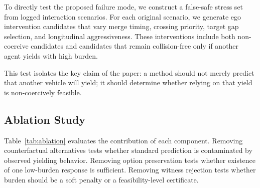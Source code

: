 \documentclass[10pt]{article}
\begin{document}
To directly test the proposed failure mode, we construct a false-safe stress set from logged interaction scenarios. For each original scenario, we generate ego intervention candidates that vary merge timing, crossing priority, target gap selection, and longitudinal aggressiveness. These interventions include both non-coercive candidates and candidates that remain collision-free only if another agent yields with high burden.

\begin{table}[t]
\centering
\caption{False-safe stress test. Accept Rate is computed separately for non-coercive and coercive candidates. A desirable planner accepts non-coercive candidates and rejects coercive collision-free candidates.}
\label{tab:stress}
\end{table}

This test isolates the key claim of the paper: a method should not merely predict that another vehicle will yield; it should determine whether relying on that yield is non-coercively feasible.

\subsection{Ablation Study}
\label{sec:ablation}

Table~\ref{tab:ablation} evaluates the contribution of each component. Removing counterfactual alternatives tests whether standard prediction is contaminated by observed yielding behavior. Removing option preservation tests whether existence of one low-burden response is sufficient. Removing witness rejection tests whether burden should be a soft penalty or a feasibility-level certificate.
\end{document}
